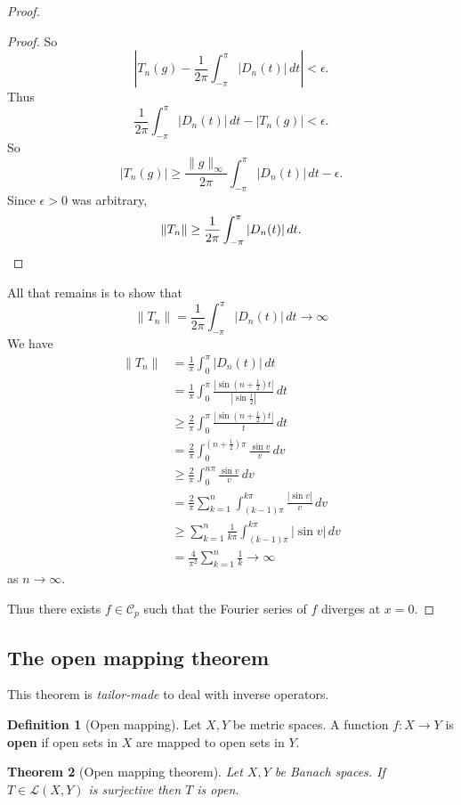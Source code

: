 \documentclass[10pt, reqno, oneside]{amsart}
\theoremstyle{plain}%
\newtheorem{thm}{Theorem}[section]
\theoremstyle{definition}
\newtheorem{defn}[thm]{Definition}
\theoremstyle{remark}
\begin{document}
\begin{proof}
\begin{proof}
	  So \[
		\left| T_n(g) - \frac{1}{2\pi} \int_{-\pi}^\pi |D_n(t)| \, dt \right| < \epsilon.
	\]  Thus \[
		\frac{1}{2\pi} \int_{-\pi}^\pi |D_n(t) | \, dt - |T_n(g)| < \epsilon.  
	\]  So \[
		|T_n(g)| \geq \frac{\| g \|_\infty}{2 \pi} \int_{-\pi}^\pi |D_n(t)| \, dt - \epsilon. 
	\]  Since $\epsilon > 0$ was arbitrary, \[
		\|T_n \| \geq \frac{1}{2 \pi} \int_{-\pi}^\pi |D_n(t) | \, dt. \qedhere
	\]
\end{proof}

All that remains is to show that \[
	\|T_n \| = \frac{1}{2\pi} \int_{-\pi}^\pi |D_n(t)| \, dt \rightarrow \infty
\]  We have 
\begin{align*}
	\|T_n \| 	&= \frac{1}{\pi}\int_0^\pi |D_n(t) | \, dt \\
				&= \frac{1}{\pi} \int_0^\pi \frac{|\sin(n+\frac{1}{2})t|}{|\sin \frac{t}{2}|} \, dt \\
				&\geq \frac{2}{\pi} \int_0^\pi \frac{|\sin(n+\frac{1}{2}) t |}{t} \, dt \\
				&= \frac{2}{\pi} \int_0^{(n+\frac{1}{2})\pi} \frac{\sin v}{v} \, dv \\
				&\geq \frac{2}{\pi} \int_0^{n\pi} \frac{\sin v}{v} \, dv \\
				&= \frac{2}{\pi} \sum_{k=1}^n \int_{(k-1)\pi}^{k \pi} \frac{|\sin v|}{v} \, dv \\
				&\geq \sum_{k=1}^n \frac{1}{k \pi} \int_{(k-1)\pi}^{k \pi} |\sin v | \, dv \\
				&= \frac{4}{\pi^2} \sum_{k =1 }^n \frac{1}{k} \rightarrow \infty
\end{align*} as $n \rightarrow \infty$.  

Thus there exists $f \in \mathcal C_p$ such that the Fourier series of $f$ diverges at $x = 0$.  
\end{proof}

\subsection{The open mapping theorem} %
\label{sub:the_open_mapping_theorem}
This theorem is \emph{tailor-made} to deal with inverse operators.

\begin{defn}[Open mapping]
	Let $X, Y$ be metric spaces.  A function $f : X \rightarrow Y$ is \textbf{open} if open sets in $X$ are mapped to open sets in $Y$.  
\end{defn}

\begin{thm}[Open mapping theorem]
	Let $X, Y$ be Banach spaces.  If $T \in \mathcal{L}(X,Y)$ is surjective then $T$ is open. 
\end{thm}
\end{document}
